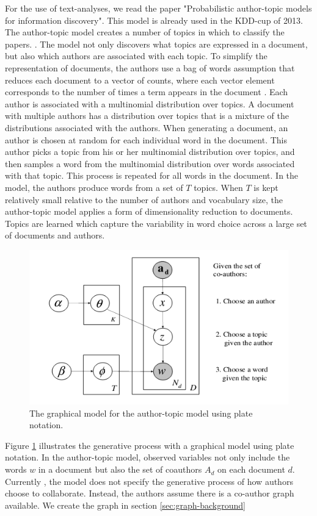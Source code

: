 

For the use of text-analyses, we read the paper "Probabilistic author-topic models for information discovery". This model is already used in the KDD-cup of 2013. The author-topic model creates a number of topics in which to classify the papers.  \cite{steyvers2004probabilistic}. The model not only discovers what topics are expressed in a document, but also which authors are associated with each topic. To simplify the representation of documents, the authors use a bag of words assumption that reduces each document to a vector of counts, where each vector element corresponds to the number of times a term appears in the document \cite{chowdhury2010introduction}. Each author is associated with a multinomial distribution over topics. A document with multiple authors has a distribution over topics that is a mixture of the distributions associated with the authors. When generating a document, an author is chosen at random for each individual word in the document. This author picks a topic from his or her multinomial distribution over topics, and then samples a word from the multinomial distribution over words associated with that topic. This process is repeated for all words in the document. In the model, the authors produce words from a set of $T$ topics. When $T$ is kept relatively small relative to the number of authors and vocabulary size, the author-topic model applies a form of dimensionality reduction to documents. Topics are learned which capture the variability in word choice across a large set of documents and authors. 

\begin{figure}
\begin{center}
	\includegraphics[scale=1]{./Images/model.png}
	\caption{The graphical model for the author-topic
model using plate notation.\cite{steyvers2004probabilistic} \label{fig:model}}
\end{center}
\end{figure}

Figure \ref{fig:model} illustrates the generative process with a graphical model using plate notation. In the author-topic model, observed variables not only include the words $w$ in a document but also the set of coauthors $A_d$ on each document $d$. Currently , the model does not specify the generative process of how authors choose to collaborate. Instead, the authors assume there is a co-author graph available. We create the graph in section \ref{sec:graph-background}
